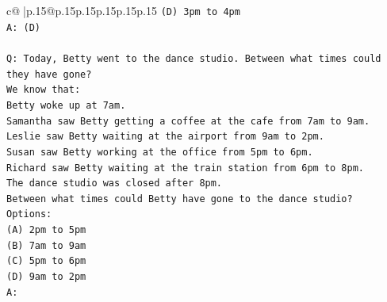 \documentclass{article}
\begin{document}
{\begin{supertabular}{c@{$\;$}|p{.15\linewidth}@{}p{.15\linewidth}p{.15\linewidth}p{.15\linewidth}p{.15\linewidth}p{.15\linewidth}}
{{{\texttt{(D) 3pm to 4pm} \\
\texttt{A: (D)} \\
\\ 
\texttt{Q: Today, Betty went to the dance studio. Between what times could they have gone?} \\
\texttt{We know that:} \\
\texttt{Betty woke up at 7am.} \\
\texttt{Samantha saw Betty getting a coffee at the cafe from 7am to 9am.} \\
\texttt{Leslie saw Betty waiting at the airport from 9am to 2pm.} \\
\texttt{Susan saw Betty working at the office from 5pm to 6pm.} \\
\texttt{Richard saw Betty waiting at the train station from 6pm to 8pm.} \\
\texttt{The dance studio was closed after 8pm.} \\
\texttt{Between what times could Betty have gone to the dance studio?} \\
\texttt{Options:} \\
\texttt{(A) 2pm to 5pm} \\
\texttt{(B) 7am to 9am} \\
\texttt{(C) 5pm to 6pm} \\
\texttt{(D) 9am to 2pm} \\
\texttt{A:} \\
            }
        }
    }
     \\ \\


\end{supertabular}}
\end{document}
